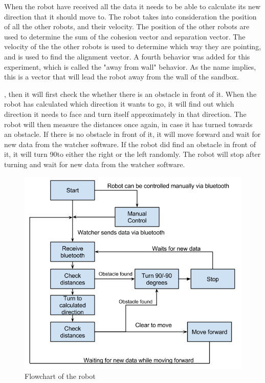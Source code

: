When the robot have received all the data it needs to be able to calculate its new direction that it should move to. The robot takes into consideration the position of all the other robots, and their velocity. The position of the other robots are used to determine the sum of the cohesion vector and separation vector. The velocity of the the other robots is used to determine which way they are pointing, and is used to find the alignment vector. A fourth behavior was added for this experiment, which is called the "away from wall" behavior. As the name implies, this is a vector that will lead the robot away from the wall of the sandbox.

, then it will first check the whether there is an obstacle in front of it. %
When the robot has calculated which direction it wants to go, it will find out which direction it needs to face and turn itself approximately in that direction. The robot will then measure the distances once again, in case it has turned towards an obstacle. If there is no obstacle in front of it, it will move forward and wait for new data from the watcher software. If the robot did find an obstacle in front of it, it will turn 90\textdegree to either the right or the left randomly. The robot will stop after turning and wait for new data from the watcher software. 
\begin{figure}[h!]
\begin{center}
\includegraphics[width=0.8\linewidth]{figs/robotschema}
\end{center}
\caption[Robot flowchart]{Flowchart of the robot}
\label{fig:robotschema}
\end{figure}

